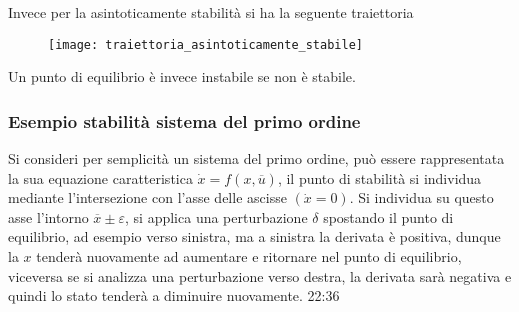 Invece per la asintoticamente stabilità si ha la seguente traiettoria
\begin{figure}[h]
\centering
\texttt{[image: traiettoria\_asintoticamente\_stabile]}
\end{figure}

Un punto di equilibrio è invece instabile se non è stabile.

\subsubsection{Esempio stabilità sistema del primo ordine}
Si consideri per semplicità un sistema del primo ordine, può essere
rappresentata la sua equazione caratteristica
$\dot{x} = f(x,\overline{u})$, il punto di stabilità si individua mediante
l'intersezione con l'asse delle ascisse $(\dot{x}=0)$. Si individua su questo
asse l'intorno $\overline{x} \pm \varepsilon$,
si applica una perturbazione $\delta$ spostando il punto di equilibrio, ad
esempio verso sinistra, ma a sinistra la derivata è positiva, dunque la $x$
tenderà nuovamente ad aumentare e ritornare nel punto di equilibrio, viceversa
se si analizza una perturbazione verso destra, la
derivata sarà negativa e quindi lo stato tenderà a diminuire nuovamente. 22:36
